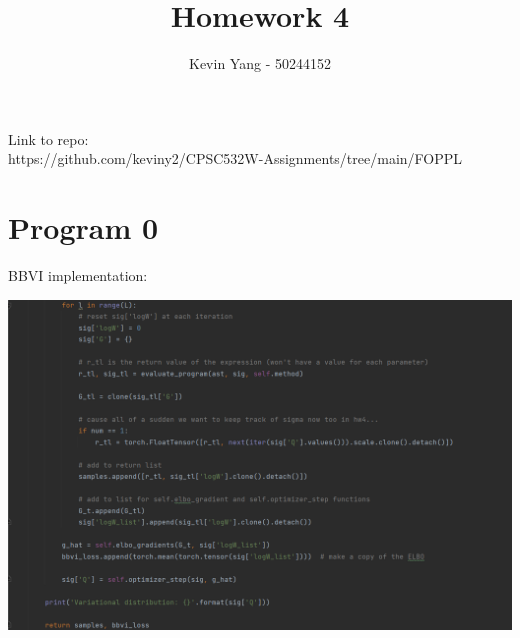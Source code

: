 \documentclass[10pt]{homeworg}
\title{Homework 4}
\author{Kevin Yang - 50244152}
\begin{document}
\maketitle

\Huge{Link to repo:}\\
\Large{https://github.com/keviny2/CPSC532W-Assignments/tree/main/FOPPL}

\section*{Program 0}
BBVI implementation:
\begin{center}
\includegraphics[scale=0.5]{figures/bbvi.png}
\end{center}

\newpage
\end{document}
